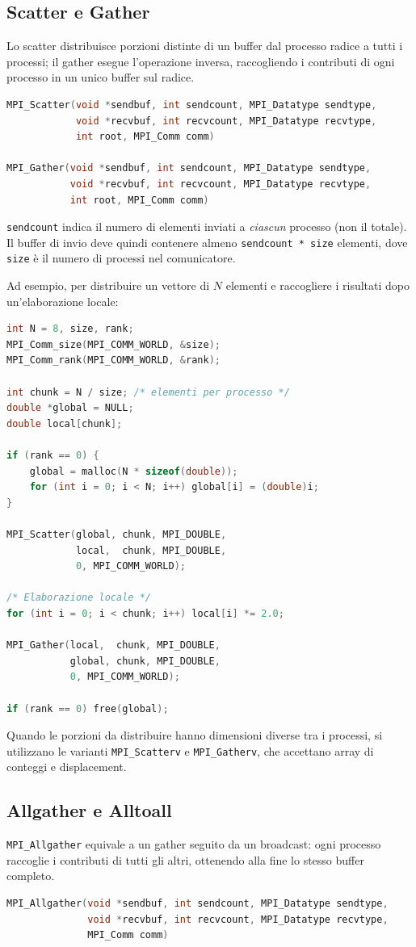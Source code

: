 \subsection{Scatter e Gather}
Lo scatter distribuisce porzioni distinte di un buffer dal processo radice a tutti i processi; il gather esegue l'operazione inversa, raccogliendo i contributi di ogni processo in un unico buffer sul radice.
\begin{lstlisting}[language=C, numbers=none]
MPI_Scatter(void *sendbuf, int sendcount, MPI_Datatype sendtype,
            void *recvbuf, int recvcount, MPI_Datatype recvtype,
            int root, MPI_Comm comm)

MPI_Gather(void *sendbuf, int sendcount, MPI_Datatype sendtype,
           void *recvbuf, int recvcount, MPI_Datatype recvtype,
           int root, MPI_Comm comm)
\end{lstlisting}
\texttt{sendcount} indica il numero di elementi inviati a \emph{ciascun} processo (non il totale). Il buffer di invio deve quindi contenere almeno \texttt{sendcount * size} elementi, dove \texttt{size} è il numero di processi nel comunicatore.

Ad esempio, per distribuire un vettore di \(N\) elementi e raccogliere i risultati dopo un'elaborazione locale:
\begin{lstlisting}[language=C, numbers=none]
int N = 8, size, rank;
MPI_Comm_size(MPI_COMM_WORLD, &size);
MPI_Comm_rank(MPI_COMM_WORLD, &rank);

int chunk = N / size; /* elementi per processo */
double *global = NULL;
double local[chunk];

if (rank == 0) {
    global = malloc(N * sizeof(double));
    for (int i = 0; i < N; i++) global[i] = (double)i;
}

MPI_Scatter(global, chunk, MPI_DOUBLE,
            local,  chunk, MPI_DOUBLE,
            0, MPI_COMM_WORLD);

/* Elaborazione locale */
for (int i = 0; i < chunk; i++) local[i] *= 2.0;

MPI_Gather(local,  chunk, MPI_DOUBLE,
           global, chunk, MPI_DOUBLE,
           0, MPI_COMM_WORLD);

if (rank == 0) free(global);
\end{lstlisting}
Quando le porzioni da distribuire hanno dimensioni diverse tra i processi, si utilizzano le varianti \texttt{MPI\_Scatterv} e \texttt{MPI\_Gatherv}, che accettano array di conteggi e displacement.

\subsection{Allgather e Alltoall}
\texttt{MPI\_Allgather} equivale a un gather seguito da un broadcast: ogni processo raccoglie i contributi di tutti gli altri, ottenendo alla fine lo stesso buffer completo.
\begin{lstlisting}[language=C, numbers=none]
MPI_Allgather(void *sendbuf, int sendcount, MPI_Datatype sendtype,
              void *recvbuf, int recvcount, MPI_Datatype recvtype,
              MPI_Comm comm)
\end{lstlisting}

